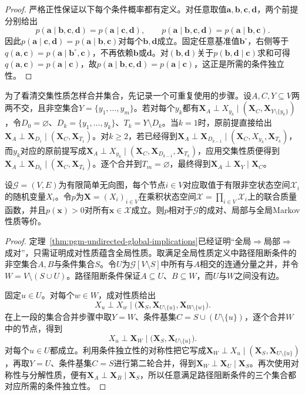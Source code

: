 \begin{proof}
严格正性保证以下每个条件概率都有定义。对任意取值$\bm{a},\bm{b},\bm{c},\bm{d}$，两个前提分别给出
\[
  p(\bm{a}\mid\bm{b},\bm{c},\bm{d})
  =p(\bm{a}\mid\bm{c},\bm{d}),
  \qquad
  p(\bm{a}\mid\bm{b},\bm{c},\bm{d})
  =p(\bm{a}\mid\bm{b},\bm{c}).
\]
因此$p(\bm{a}\mid\bm{c},\bm{d})=p(\bm{a}\mid\bm{b},\bm{c})$对每个$\bm{b},\bm{d}$成立。固定任意基准值$\bm{b}^{\circ}$，右侧等于$q(\bm{a},\bm{c})=p(\bm{a}\mid\bm{b}^{\circ},\bm{c})$，不再依赖$\bm{b}$或$\bm{d}$。对$(\bm{b},\bm{d})$关于$p(\bm{b},\bm{d}\mid\bm{c})$求和可得$q(\bm{a},\bm{c})=p(\bm{a}\mid\bm{c})$，故$p(\bm{a}\mid\bm{b},\bm{c},\bm{d})=p(\bm{a}\mid\bm{c})$，这正是所需的条件独立性。
\end{proof}

为了看清交集性质怎样合并集合，先记录一个可重复使用的步骤。设$A,C,Y\subseteq V$两两不交，且非空集合$Y=\{y_1,\ldots,y_m\}$。若对每个$y_k$都有$\bm{X}_A\perp X_{y_k}\mid(\bm{X}_C,\bm{X}_{Y\setminus\{y_k\}})$，令$D_0=\varnothing$、$D_k=\{y_1,\ldots,y_k\}$、$T_k=Y\setminus D_k$。当$k=1$时，原前提直接给出$\bm{X}_A\perp\bm{X}_{D_1}\mid(\bm{X}_C,\bm{X}_{T_1})$。对$k\geq2$，若已经得到$\bm{X}_A\perp\bm{X}_{D_{k-1}}\mid(\bm{X}_C,X_{y_k},\bm{X}_{T_k})$，而$y_k$对应的原前提写成$\bm{X}_A\perp X_{y_k}\mid(\bm{X}_C,\bm{X}_{D_{k-1}},\bm{X}_{T_k})$，应用交集性质便得到$\bm{X}_A\perp\bm{X}_{D_k}\mid(\bm{X}_C,\bm{X}_{T_k})$。逐个合并到$T_m=\varnothing$，最终得到$\bm{X}_A\perp\bm{X}_Y\mid\bm{X}_C$。

\begin{theorem}[严格正条件下三种Markov性质等价]
  \label{thm:pgm-undirected-markov-equivalence}
  设$\mathcal{G}=(V,E)$为有限简单无向图，每个节点$i\in V$对应取值于有限非空状态空间$\mathcal{X}_i$的随机变量$X_i$。令$p$为$\bm{X}=(X_i)_{i\in V}$在乘积状态空间$\mathcal{X}=\prod_{i\in V}\mathcal{X}_i$上的联合质量函数，并且$p(\bm{x})>0$对所有$\bm{x}\in\mathcal{X}$成立。则$p$相对于$\mathcal{G}$的成对、局部与全局Markov性质等价。
\end{theorem}

\begin{proof}
定理~\ref{thm:pgm-undirected-global-implications}已经证明“全局$\Rightarrow$局部$\Rightarrow$成对”，只需证明成对性质蕴含全局性质。取满足全局性质定义中路径阻断条件的非空集合$A,B$与条件集合$S$。令$U$为$\mathcal{G}[V\setminus S]$中所有与$A$相交的连通分量之并，并令$W=V\setminus(S\cup U)$。路径阻断条件保证$A\subseteq U$、$B\subseteq W$，而$U$与$W$之间没有边。

固定$u\in U$。对每个$w\in W$，成对性质给出
\[
  X_u\perp X_w
  \mid
  \bigl(\bm{X}_S,\bm{X}_{U\setminus\{u\}},
        \bm{X}_{W\setminus\{w\}}\bigr).
\]
在上一段的集合合并步骤中取$Y=W$、条件基集$C=S\cup(U\setminus\{u\})$，逐个合并$W$中的节点，得到
\[
  X_u\perp\bm{X}_W
  \mid\bigl(\bm{X}_S,\bm{X}_{U\setminus\{u\}}\bigr).
\]
对每个$u\in U$都成立。利用条件独立性的对称性把它写成$\bm{X}_W\perp X_u\mid(\bm{X}_S,\bm{X}_{U\setminus\{u\}})$，再取$Y=U$、条件基集$C=S$进行第二轮合并，得到$\bm{X}_W\perp\bm{X}_U\mid\bm{X}_S$。再次使用对称性与分解性质，便有$\bm{X}_A\perp\bm{X}_B\mid\bm{X}_S$，所以任意满足路径阻断条件的三个集合都对应所需的条件独立性。
\end{proof}

